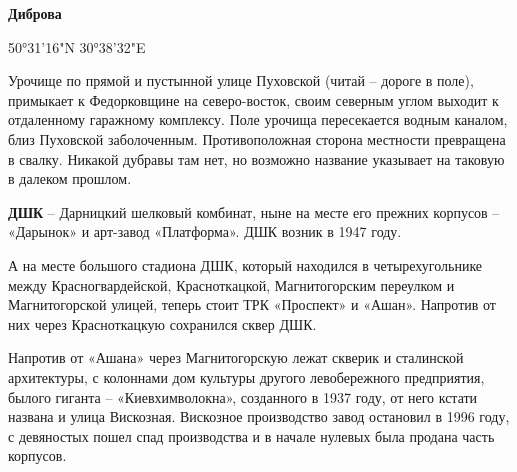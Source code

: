\medskip

\textbf{Диброва}

50°31'16"N 30°38'32"E 

Урочище по прямой и пустынной улице Пуховской (читай – дороге в поле), примыкает к Федорковщине на северо-восток, своим северным углом выходит к отдаленному гаражному комплексу. Поле урочища пересекается водным каналом, близ Пуховской заболоченным. Противоположная сторона местности превращена в свалку. Никакой дубравы там нет, но возможно название указывает на таковую в далеком прошлом.\\

\medskip

\textbf{ДШК} – Дарницкий шелковый комбинат, ныне на месте его прежних корпусов – «Дарынок» и арт-завод «Платформа». ДШК возник в 1947 году.

А на месте большого стадиона ДШК, который находился в четырехугольнике между Красногвардейской, Красноткацкой, Магнитогорским переулком и Магнитогорской улицей, теперь стоит ТРК «Проспект» и «Ашан». Напротив от них через Красноткацкую сохранился сквер ДШК. 

Напротив от «Ашана» через Магнитогорскую лежат скверик и сталинской архитектуры, с колоннами дом культуры другого левобережного предприятия, былого гиганта – «Киевхимволокна», созданного в 1937 году, от него кстати названа и улица Вискозная. Вискозное производство завод остановил в 1996 году, с девяностых пошел спад производства и в начале нулевых была продана часть корпусов.